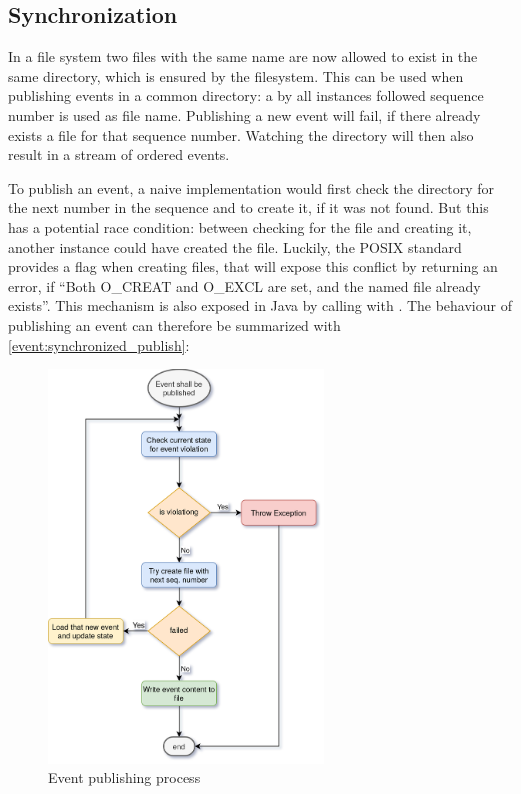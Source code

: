 \subsection{Synchronization}

In a file system two files with the same name are now allowed to exist in the same directory, which is ensured by the filesystem.
This can be used when publishing events in a common directory: a by all instances followed sequence number is used as file name.
Publishing a new event will fail, if there already exists a file for that sequence number.
Watching the directory will then also result in a stream of ordered events.

To publish an event, a naive implementation would first check the directory for the next number in the sequence and to create it, if it was not found.
But this has a potential race condition: between checking for the file and creating it, another instance could have created the file.
Luckily, the POSIX standard provides a flag when creating files, that will expose this conflict by returning an error, if \enquote{Both O\_CREAT and O\_EXCL are set, and the named file already exists}\cite{gnu:open}.
This mechanism is also exposed in Java by calling \cite{javadoc:files:write} with \cite{javadoc:standard_open_options:create_new}.
The behaviour of publishing an event can therefore be summarized with \autoref{event:synchronized_publish}:

\begin{figure}[H]
	\centering
	\includegraphics[width=0.65\textwidth]{event_publishing.png}
	\caption{Event publishing process}
	\label{event:synchronized_publish}
\end{figure}

